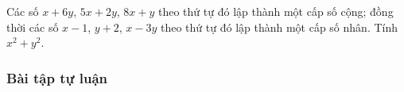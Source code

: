 \begin{vd}[VD]%
	Các số $x+6y$, $5x+2y$, $8x+y$ theo thứ tự đó lập thành một cấp số cộng; đồng thời các số $x-1$, $y+2$, $x-3y$ theo thứ tự đó lập thành một cấp số nhân. Tính $x^2+y^2$.
\end{vd}
\subsubsection{Bài tập tự luận}
 
